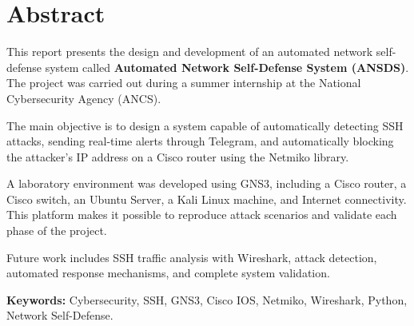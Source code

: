 \chapter*{Abstract}

This report presents the design and development of an automated network self-defense system called \textbf{Automated Network Self-Defense System (ANSDS)}. The project was carried out during a summer internship at the National Cybersecurity Agency (ANCS).

The main objective is to design a system capable of automatically detecting SSH attacks, sending real-time alerts through Telegram, and automatically blocking the attacker's IP address on a Cisco router using the Netmiko library.

A laboratory environment was developed using GNS3, including a Cisco router, a Cisco switch, an Ubuntu Server, a Kali Linux machine, and Internet connectivity. This platform makes it possible to reproduce attack scenarios and validate each phase of the project.

Future work includes SSH traffic analysis with Wireshark, attack detection, automated response mechanisms, and complete system validation.

\textbf{Keywords:} Cybersecurity, SSH, GNS3, Cisco IOS, Netmiko, Wireshark, Python, Network Self-Defense.